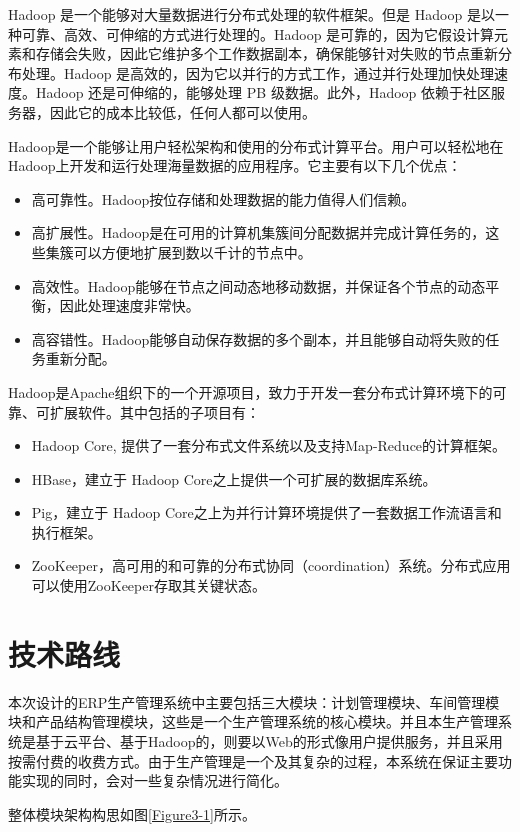 \documentclass{Proposal}
\begin{document}
Hadoop 是一个能够对大量数据进行分布式处理的软件框架。但是 Hadoop 是以一种可靠、高效、可伸缩的方式进行处理的。Hadoop 是可靠的，因为它假设计算元素和存储会失败，因此它维护多个工作数据副本，确保能够针对失败的节点重新分布处理。Hadoop 是高效的，因为它以并行的方式工作，通过并行处理加快处理速度。Hadoop 还是可伸缩的，能够处理 PB 级数据。此外，Hadoop 依赖于社区服务器，因此它的成本比较低，任何人都可以使用。

Hadoop是一个能够让用户轻松架构和使用的分布式计算平台。用户可以轻松地在Hadoop上开发和运行处理海量数据的应用程序。它主要有以下几个优点：
\begin{itemize}
\item 高可靠性。Hadoop按位存储和处理数据的能力值得人们信赖。
\item 高扩展性。Hadoop是在可用的计算机集簇间分配数据并完成计算任务的，这些集簇可以方便地扩展到数以千计的节点中。
\item 高效性。Hadoop能够在节点之间动态地移动数据，并保证各个节点的动态平衡，因此处理速度非常快。
\item 高容错性。Hadoop能够自动保存数据的多个副本，并且能够自动将失败的任务重新分配。
\end{itemize}

Hadoop是Apache组织下的一个开源项目，致力于开发一套分布式计算环境下的可靠、可扩展软件。其中包括的子项目有： 
\begin{itemize}
\item Hadoop Core, 提供了一套分布式文件系统以及支持Map-Reduce的计算框架。 
\item HBase，建立于 Hadoop Core之上提供一个可扩展的数据库系统。 
\item Pig，建立于 Hadoop Core之上为并行计算环境提供了一套数据工作流语言和执行框架。
\item ZooKeeper，高可用的和可靠的分布式协同（coordination）系统。分布式应用可以使用ZooKeeper存取其关键状态。
\end{itemize}

\section{技术路线}

本次设计的ERP生产管理系统中主要包括三大模块：计划管理模块、车间管理模块和产品结构管理模块，这些是一个生产管理系统的核心模块。并且本生产管理系统是基于云平台、基于Hadoop的，则要以Web的形式像用户提供服务，并且采用按需付费的收费方式。由于生产管理是一个及其复杂的过程，本系统在保证主要功能实现的同时，会对一些复杂情况进行简化。

整体模块架构构思如图\ref{Figure3-1}所示。
\end{document}
